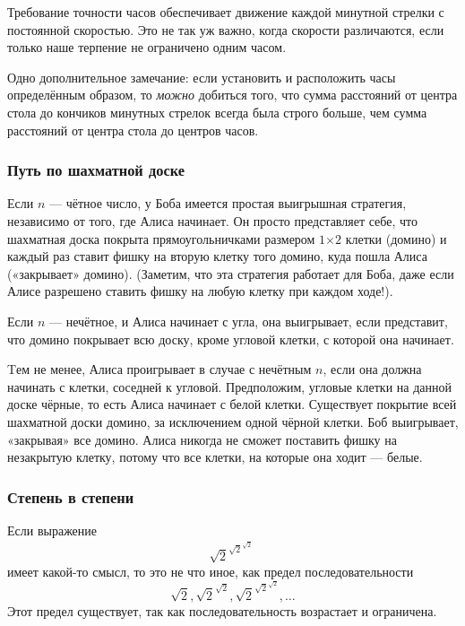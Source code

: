 Требование точности часов обеспечивает движение каждой минутной стрелки с постоянной скоростью.
Это не так уж важно, когда скорости различаются, если только наше терпение не ограничено одним часом.

Одно дополнительное замечание: если установить и расположить часы определённым образом,
то \emph{можно} добиться того, что сумма расстояний от центра стола до кончиков минутных стрелок всегда была строго больше, чем сумма расстояний от центра стола до центров часов.\heart


\subsubsection*{Путь по шахматной доске} %

Если $n$ --- чётное число, у Боба имеется простая выигрышная стратегия, независимо от того, где Алиса начинает.
Он просто представляет себе, что шахматная доска покрыта прямоугольничками размером $1{\times2}$ клетки (домино) и каждый раз ставит фишку на вторую клетку того домино, куда пошла Алиса («закрывает» домино). %
(Заметим, что эта стратегия работает для Боба, даже если Алисе разрешено ставить фишку на любую клетку при каждом ходе!).

Если $n$ --- нечётное, и Алиса начинает с угла, она выигрывает, если представит, что домино покрывает всю доску, кроме угловой клетки, с которой она начинает.

Tем не менее, Алиса проигрывает в случае с нечётным $n$, если она должна начинать с клетки, соседней к угловой.
Предположим, угловые клетки на данной доске чёрные, то есть Алиса начинает с белой клетки.
Существует покрытие всей шахматной доски домино, за исключением одной чёрной клетки.
Боб выигрывает, «закрывая» все домино.
Алиса
никогда не сможет поставить фишку на незакрытую клетку, потому что все клетки, на которые она ходит --- белые.\heart


\subsubsection*{Степень в степени} %

Если выражение
$${\sqrt{2}}^{{\sqrt{2}}^{{\sqrt{2}}^{{\cdot}^{\cdot^{\cdot}}}}}$$
имеет какой-то смысл, то это не что иное, как предел последовательности
$${\sqrt{2}}, {\sqrt{2}}^{{\sqrt{2}}}, {\sqrt{2}}^{{\sqrt{2}}^{{\sqrt{2}}}},\dots$$
Этот предел существует, так как последовательность возрастает и ограничена.

